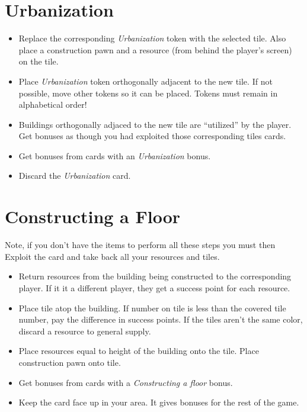 \documentclass[10pt]{article}
\newenvironment{itemizeCustom}
{\begin{itemize}
  \setlength{\itemsep}{1pt}
  \setlength{\parskip}{0pt}
  \setlength{\parsep}{0pt}}
{\end{itemize}}
\begin{document}
\begin{mdframed}[style = customFrame]
\begin{multicols*}{2}
\section*{Urbanization}
\begin{itemizeCustom}
	\item Replace the corresponding \emph{Urbanization} token with the selected tile. Also place a construction pawn and a resource (from behind the player's screen) on the tile.
	\item Place \emph{Urbanization} token orthogonally adjacent to the new tile. If not possible, move other tokens so it can be placed. Tokens must remain in alphabetical order!
	\item Buildings orthogonally adjaced to the new tile are ``utilized'' by the player. Get bonuses as though you had exploited those corresponding tiles cards.
	\item Get bonuses from cards with an \emph{Urbanization} bonus.
	\item Discard the \emph{Urbanization} card.
\end{itemizeCustom}

\section*{Constructing a Floor}
Note, if you don't have the items to perform all these steps you must then Exploit the card and take back all your resources and tiles.
\begin{itemizeCustom}
	\item Return resources from the building being constructed to the corresponding player. If it it a different player, they get a success point for each resource.
	\item Place tile atop the building. If number on tile is less than the covered tile number, pay the difference in success points. If the tiles aren't the same color, discard a resource to general supply.
	\item Place resources equal to height of the building onto the tile. Place construction pawn onto tile.
	\item Get bonuses from cards with a \emph{Constructing a floor} bonus.
	\item Keep the card face up in your area. It gives bonuses for the rest of the game.
\end{itemizeCustom}


\end{multicols*}
\end{mdframed}
\end{document}
